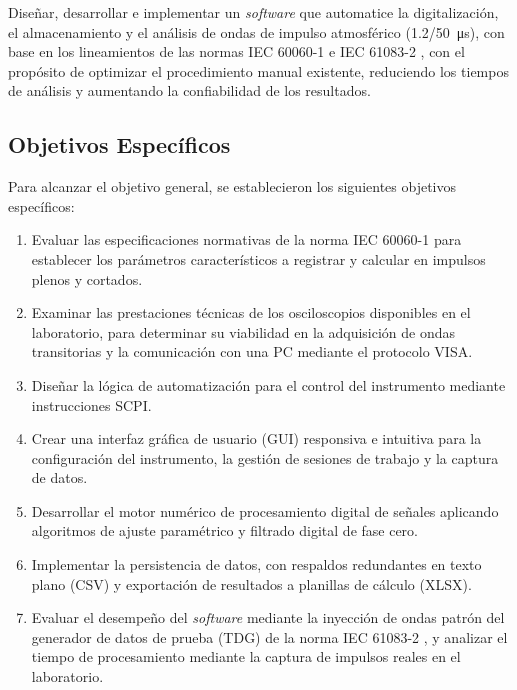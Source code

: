 Diseñar, desarrollar e implementar un \emph{software} que automatice la digitalización, el almacenamiento y el análisis de ondas de impulso atmosférico (\qty[parse-numbers=false]{1.2/50}{\micro\second}), con base en los lineamientos de las normas IEC 60060-1 \cite{iec60060_1} e IEC 61083-2 \cite{iec61083_2}, con el propósito de optimizar el procedimiento manual existente, reduciendo los tiempos de análisis y aumentando la confiabilidad de los resultados.

\subsection{Objetivos Específicos}
\label{subsec:objetivos_especificos}

Para alcanzar el objetivo general, se establecieron los siguientes objetivos específicos:

\begin{enumerate}
    \item Evaluar las especificaciones normativas de la norma IEC 60060-1 \cite{iec60060_1} para establecer los parámetros característicos a registrar y calcular en impulsos plenos y cortados.
    \item Examinar las prestaciones técnicas de los osciloscopios disponibles en el laboratorio, para determinar su viabilidad en la adquisición de ondas transitorias y la comunicación con una PC mediante el protocolo VISA.
    \item Diseñar la lógica de automatización para el control del instrumento mediante instrucciones SCPI.
    \item Crear una interfaz gráfica de usuario (GUI) responsiva e intuitiva para la configuración del instrumento, la gestión de sesiones de trabajo y la captura de datos.
    \item Desarrollar el motor numérico de procesamiento digital de señales aplicando algoritmos de ajuste paramétrico y filtrado digital de fase cero.
    \item Implementar la persistencia de datos, con respaldos redundantes en texto plano (CSV) y exportación de resultados a planillas de cálculo (XLSX).
    \item Evaluar el desempeño del \emph{software} mediante la inyección de ondas patrón del generador de datos de prueba (TDG) de la norma IEC 61083-2 \cite{iec61083_2}, y analizar el tiempo de procesamiento mediante la captura de impulsos reales en el laboratorio.
\end{enumerate}

